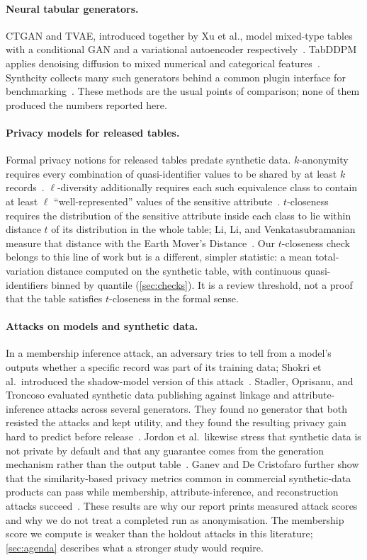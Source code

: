 \documentclass[11pt,a4paper]{article}
\begin{document}
\paragraph{Neural tabular generators.}
CTGAN and TVAE, introduced together by Xu et al., model mixed-type tables with a conditional GAN and a variational autoencoder respectively~\cite{xu2019}. TabDDPM applies denoising diffusion to mixed numerical and categorical features~\cite{kotelnikov2023}. Synthcity collects many such generators behind a common plugin interface for benchmarking~\cite{qian2023}. These methods are the usual points of comparison; none of them produced the numbers reported here.

\paragraph{Privacy models for released tables.}
Formal privacy notions for released tables predate synthetic data. $k$-anonymity requires every combination of quasi-identifier values to be shared by at least $k$ records~\cite{sweeney2002}. $\ell$-diversity additionally requires each such equivalence class to contain at least $\ell$ ``well-represented'' values of the sensitive attribute~\cite{machanavajjhala2007}. $t$-closeness requires the distribution of the sensitive attribute inside each class to lie within distance $t$ of its distribution in the whole table; Li, Li, and Venkatasubramanian measure that distance with the Earth Mover's Distance~\cite{li2007}. Our $t$-closeness check belongs to this line of work but is a different, simpler statistic: a mean total-variation distance computed on the synthetic table, with continuous quasi-identifiers binned by quantile (\cref{sec:checks}). It is a review threshold, not a proof that the table satisfies $t$-closeness in the formal sense.

\paragraph{Attacks on models and synthetic data.}
In a membership inference attack, an adversary tries to tell from a model's outputs whether a specific record was part of its training data; Shokri et al.\ introduced the shadow-model version of this attack~\cite{shokri2017}. Stadler, Oprisanu, and Troncoso evaluated synthetic data publishing against linkage and attribute-inference attacks across several generators. They found no generator that both resisted the attacks and kept utility, and they found the resulting privacy gain hard to predict before release~\cite{stadler2022}. Jordon et al.\ likewise stress that synthetic data is not private by default and that any guarantee comes from the generation mechanism rather than the output table~\cite{jordon2022}. Ganev and De Cristofaro further show that the similarity-based privacy metrics common in commercial synthetic-data products can pass while membership, attribute-inference, and reconstruction attacks succeed~\cite{ganev2025}. These results are why our report prints measured attack scores and why we do not treat a completed run as anonymisation. The membership score we compute is weaker than the holdout attacks in this literature; \cref{sec:agenda} describes what a stronger study would require.
\end{document}
